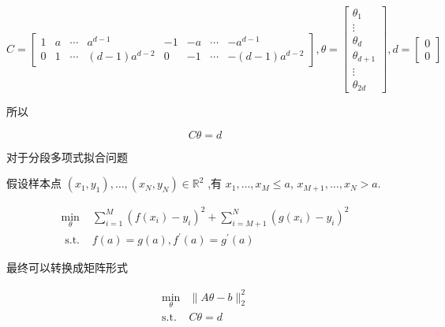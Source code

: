 \begin{notation}
    \begin{equation} C=\left[\begin{array}{cccccccc}1 & a & \cdots & a^{d-1} & -1 & -a & \cdots & -a^{d-1} \\ 0 & 1 & \cdots & (d-1) a^{d-2} & 0 & -1 & \cdots & -(d-1) a^{d-2}\end{array}\right], 
    \theta =\left[\begin{array}{ c }
        \theta _{1}\\
        \vdots \\
        \theta _{d}\\
        \theta _{d+1}\\
        \vdots \\
        \theta _{2d}
        \end{array}\right], 
    d=\left[\begin{array}{l}0 \\ 0\end{array}\right] \end{equation}
\end{notation}


所以

\begin{equation} C \theta=d \end{equation}

对于分段多项式拟合问题

\begin{problem}[分段多项式拟合问题]
    假设样本点 $ \left(x_{1}, y_{1}\right), \ldots,\left(x_{N}, y_{N}\right) \in \mathbb{R}^{2} $ ,有 $ x_{1}, \ldots, x_{M} \leq a $, $ x_{M+1}, \ldots, x_{N}>a $.

     \begin{equation}\begin{array}{ll}\min _{\theta} & \sum_{i=1}^{M}\left(f\left(x_{i}\right)-y_{i}\right)^{2}+\sum_{i=M+1}^{N}\left(g\left(x_{i}\right)-y_{i}\right)^{2} \\ \text { s.t. } & f(a)=g(a), f^{\prime}(a)=g^{\prime}(a)\end{array}\end{equation}
\end{problem}

最终可以转换成矩阵形式

\begin{problem}
    \begin{equation}\begin{aligned}
        \min _{\theta}&\|A \theta-b\|_{2}^{2}\\
       \text{s.t.} & C \theta=d
    \end{aligned}\end{equation}

\end{problem}

